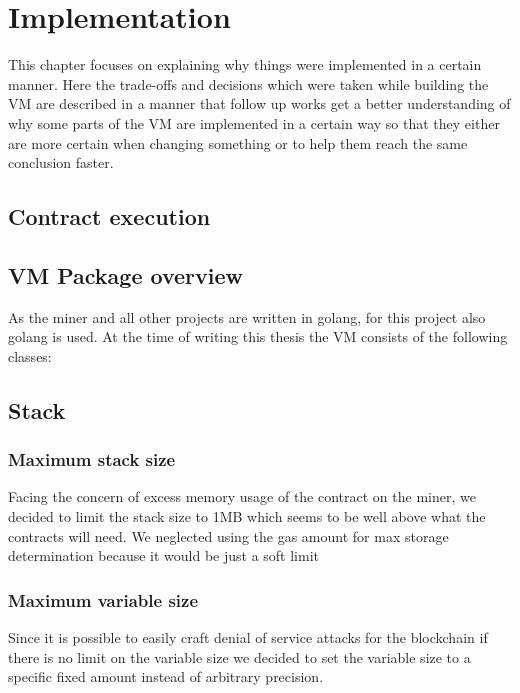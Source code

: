 \chapter{Implementation}
\thispagestyle{main} %
This chapter focuses on explaining why things were implemented in a certain manner. Here the trade-offs and decisions which were taken while building the VM are described in a manner that follow up works get a better understanding of why some parts of the VM are implemented in a certain way so that they either are more certain when changing something or to help them reach the same conclusion faster.

\section{Contract execution}

\section{VM Package overview}
As the miner and all other projects are written in golang, for this project also golang is used. 
At the time of writing this thesis the VM consists of the following classes: 





\section{Stack}


\subsection{Maximum stack size}
Facing the concern of excess memory usage of the contract on the miner, we decided to limit the stack size to 1MB which seems to be well above what the contracts will need. We neglected using the gas amount for max storage determination because it would be just a soft limit

\subsection{Maximum variable size}
Since it is possible to easily craft denial of service attacks for the blockchain if there is no limit on the variable size we decided to set the variable size to a specific fixed amount instead of arbitrary precision.

